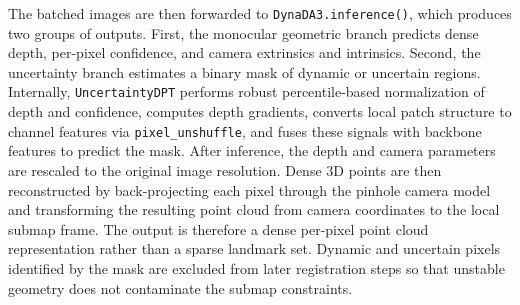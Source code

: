 The batched images are then forwarded to \texttt{DynaDA3.inference()}, which produces two groups of outputs. First, the monocular geometric branch predicts dense depth, per-pixel confidence, and camera extrinsics and intrinsics. Second, the uncertainty branch estimates a binary mask of dynamic or uncertain regions. Internally, \texttt{UncertaintyDPT} performs robust percentile-based normalization of depth and confidence, computes depth gradients, converts local patch structure to channel features via \texttt{pixel\_unshuffle}, and fuses these signals with backbone features to predict the mask. After inference, the depth and camera parameters are rescaled to the original image resolution. Dense 3D points are then reconstructed by back-projecting each pixel through the pinhole camera model and transforming the resulting point cloud from camera coordinates to the local submap frame. The output is therefore a dense per-pixel point cloud representation rather than a sparse landmark set. Dynamic and uncertain pixels identified by the mask are excluded from later registration steps so that unstable geometry does not contaminate the submap constraints.

